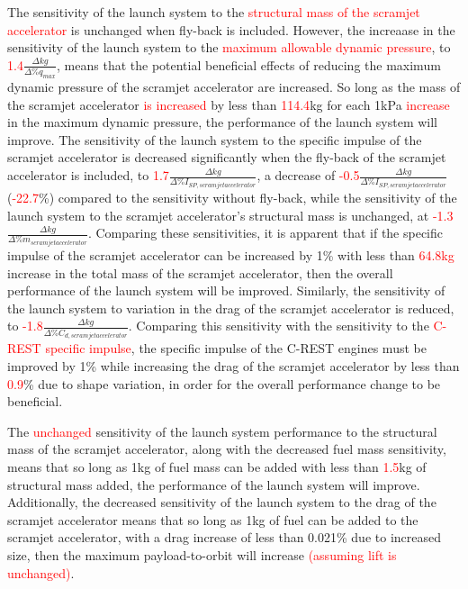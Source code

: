 The sensitivity of the launch system to the \textcolor{red}{structural mass of the scramjet accelerator} is unchanged when fly-back is included. However, the increaase in the sensitivity of the launch system to the \textcolor{red}{maximum allowable dynamic pressure}, to \textcolor{red}{1.4}$\frac{\Delta kg}{\Delta\%q_{max}}$, means that the potential beneficial effects of reducing the maximum dynamic pressure of the scramjet accelerator are increased. So long as the mass of the scramjet accelerator \textcolor{red}{is increased} by less than \textcolor{red}{114.4}kg for each 1kPa \textcolor{red}{increase} in the maximum dynamic pressure, the performance of the launch system will improve.
 The sensitivity of the launch system to the specific impulse of the scramjet accelerator is decreased significantly when the fly-back of the scramjet accelerator is included, to \textcolor{red}{1.7}$\frac{\Delta kg}{\Delta\%I_{SP,scramjet accelerator}}$, a decrease of \textcolor{red}{-0.5}$\frac{\Delta kg}{\Delta\%I_{SP,scramjet accelerator}}$ (\textcolor{red}{-22.7}\%) compared to the sensitivity without fly-back, while the sensitivity of the launch system to the scramjet accelerator's structural mass is unchanged, at \textcolor{red}{-1.3}$\frac{\Delta kg}{\Delta\%m_{scramjet accelerator}}$. Comparing these sensitivities, it is apparent that if the specific impulse of the scramjet accelerator can be increased by 1\% with less than \textcolor{red}{64.8kg} increase in the total mass of the scramjet accelerator, then the overall performance of the launch system will be improved.  
Similarly, the sensitivity of the launch system to variation in the drag of the scramjet accelerator is reduced, to \textcolor{red}{-1.8}$\frac{\Delta kg}{\Delta\%C_{d,scramjet accelerator}}$. Comparing this sensitivity with the sensitivity to the \textcolor{red}{C-REST specific impulse}, the specific impulse of the C-REST engines must be improved by 1\% while increasing the drag of the scramjet accelerator by less than \textcolor{red}{0.9}\% due to shape variation, in order for the overall performance change to be beneficial. 

The \textcolor{red}{unchanged} sensitivity of the launch system performance to the structural mass of the scramjet accelerator, along with the decreased fuel mass sensitivity, means that so long as 1kg of fuel mass can be added with less than \textcolor{red}{1.5}kg of structural mass added, the performance of the launch system will improve. Additionally, the decreased sensitivity of the launch system to the drag of the scramjet accelerator means that so long as 1kg of fuel can be added to the scramjet accelerator, with a drag increase of less than 0.021\% due to increased size, then the maximum payload-to-orbit will increase \textcolor{red}{(assuming lift is unchanged)}. 


